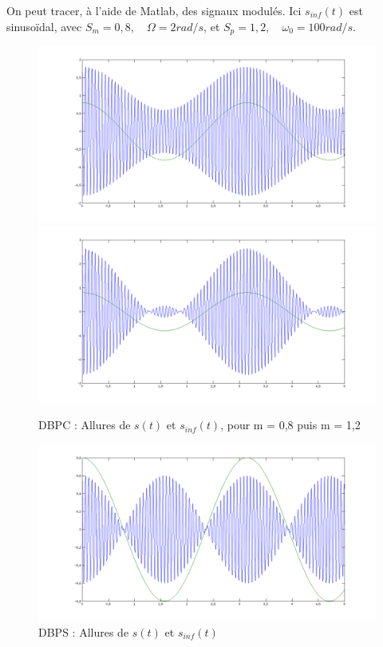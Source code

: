 \documentclass[../../Cours_M1.tex]{subfiles}
\begin{document}
On peut tracer, à l'aide de Matlab, des signaux modulés. Ici $s_{inf}(t)$ est sinusoïdal, avec $S_m=0,8,\quad \Omega=2rad/s$, et $S_p=1,2,\quad \omega_0=100rad/s$.
\begin{figure}[h!]
\centering
\includegraphics[scale=0.16]{DBPC05.png}
\includegraphics[scale=0.16]{DBPC12.png}
\caption{DBPC : Allures de $s(t)$ et $s_{inf}(t)$, pour m = 0,8 puis m = 1,2}
\end{figure}
\begin{figure}[h!]
\centering
\includegraphics[scale=0.16]{DBPS.png}
\caption{DBPS : Allures de $s(t)$ et $s_{inf}(t)$}
\end{figure}
\end{document}
